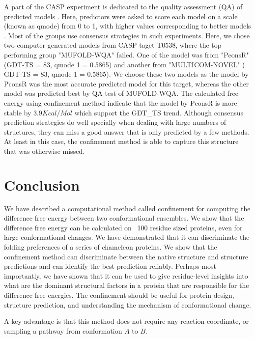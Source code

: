\documentclass[12pt]{article}
\begin{document}
A part of the CASP experiment is dedicated to the quality assessment (QA) of predicted models \cite{Kryshtafovych2011}.
Here, predictors were asked to score each model on a scale (known as qmode) from 0 to 1, with higher values
corresponding to better models \cite{Kryshtafovych2011}. Most of the groups use consensus strategies in such experiments.
Here, we chose two computer generated models from CASP taget T0538, where the top performing group "MUFOLD-WQA" \cite{Wang2011} failed.
One of the model was from "PconsR" (GDT-TS = 83, qmode 1 = 0.5865) and another from "MULTICOM-NOVEL" ( GDT-TS = 83, qmode 1 = 0.5865). We 
choose these two models as the model by PconsR was the most accurate
predicted model for this target, whereas the other model was predicted best by QA test of MUFOLD-WQA. The calculated
free energy using confinement method indicate that the model by PconsR is more stable by $3.9 Kcal/Mol$ which support
the GDT\_TS trend.  Although consensus prediction strategies do well specially when dealing with large numbers of structures, they 
can miss a good answer that is only predicted by a few methods. At least in this case, the confinement
method is able to capture this structure that was otherwise missed.


\section*{Conclusion}

We have described a computational method called confinement for computing the difference free energy between two
conformational ensembles. We show that the difference free energy can be calculated on ~100 residue sized proteins, even
for large conformational changes. We have demonstrated that it can discriminate the folding preferences of a series of
chameleon proteins. We show that the confinement method can discriminate between the native structure and structure
predictions and can identify the best prediction reliably. Perhaps most importantly, we have shown that it can be used
to give residue-level insights into what are the dominant structural factors in a protein that are responsible for the
difference free energies. The confinement should be useful for protein design, structure prediction, and understanding
the mechanism of conformational change.

A key advantage is that this method does not require any reaction coordinate, or sampling a
pathway from conformation $A$ to $B$. 
\end{document}

